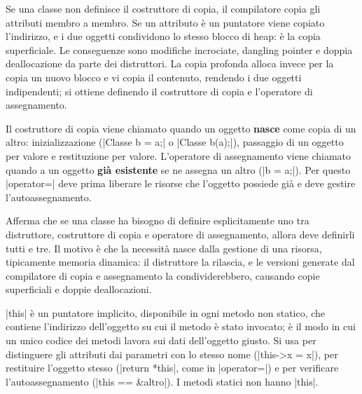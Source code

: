 \begin{orale}
Se una classe non definisce il costruttore di copia, il compilatore copia gli
attributi membro a membro. Se un attributo è un puntatore viene copiato
l'indirizzo, e i due oggetti condividono lo stesso blocco di heap: è la copia
superficiale. Le conseguenze sono modifiche incrociate, dangling pointer e doppia
deallocazione da parte dei distruttori. La copia profonda alloca invece per la
copia un nuovo blocco e vi copia il contenuto, rendendo i due oggetti indipendenti;
si ottiene definendo il costruttore di copia e l'operatore di assegnamento.
\end{orale}

\begin{orale}[D3. Quando viene chiamato il costruttore di copia e quando operator=?]
Il costruttore di copia viene chiamato quando un oggetto \textbf{nasce} come copia di
un altro: inizializzazione (\cc|Classe b = a;| o \cc|Classe b(a);|), passaggio di
un oggetto per valore e restituzione per valore. L'operatore di assegnamento viene
chiamato quando a un oggetto \textbf{già esistente} se ne assegna un altro
(\cc|b = a;|). Per questo \cc|operator=| deve prima liberare le risorse che
l'oggetto possiede già e deve gestire l'autoassegnamento.
\end{orale}

\begin{orale}
Afferma che se una classe ha bisogno di definire esplicitamente uno tra
distruttore, costruttore di copia e operatore di assegnamento, allora deve
definirli tutti e tre. Il motivo è che la necessità nasce dalla gestione di una
risorsa, tipicamente memoria dinamica: il distruttore la rilascia, e le versioni
generate dal compilatore di copia e assegnamento la condividerebbero, causando
copie superficiali e doppie deallocazioni.
\end{orale}

\begin{orale}
\cc|this| è un puntatore implicito, disponibile in ogni metodo non statico, che
contiene l'indirizzo dell'oggetto su cui il metodo è stato invocato; è il modo in
cui un unico codice dei metodi lavora sui dati dell'oggetto giusto. Si usa per
distinguere gli attributi dai parametri con lo stesso nome (\cc|this->x = x|), per
restituire l'oggetto stesso (\cc|return *this|, come in \cc|operator=|) e per
verificare l'autoassegnamento (\cc|this == &altro|). I metodi statici non hanno
\cc|this|.
\end{orale}

